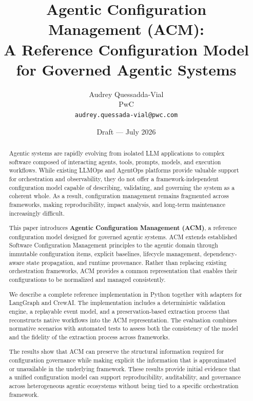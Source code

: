 \documentclass[10pt]{article}
\title{\textbf{Agentic Configuration Management (ACM):\\A Reference Configuration Model for Governed Agentic Systems}}
\author{
  Audrey Quessadda-Vial\\
  PwC\\
  \texttt{audrey.quessada-vial@pwc.com}
}
\date{Draft --- July 2026}
\begin{document}
\maketitle

\begin{abstract}

Agentic systems are rapidly evolving from isolated LLM applications to complex software composed of interacting agents, tools, prompts, models, and execution workflows. While existing LLMOps and AgentOps platforms provide valuable support for orchestration and observability, they do not offer a framework-independent configuration model capable of describing, validating, and governing the system as a coherent whole. As a result, configuration management remains fragmented across frameworks, making reproducibility, impact analysis, and long-term maintenance increasingly difficult.

This paper introduces \textbf{Agentic Configuration Management (ACM)}, a reference configuration model designed for governed agentic systems. ACM extends established Software Configuration Management principles to the agentic domain through immutable configuration items, explicit baselines, lifecycle management, dependency-aware state propagation, and runtime provenance. Rather than replacing existing orchestration frameworks, ACM provides a common representation that enables their configurations to be normalized and managed consistently.

We describe a complete reference implementation in Python together with adapters for LangGraph and CrewAI. The implementation includes a deterministic validation engine, a replayable event model, and a preservation-based extraction process that reconstructs native workflows into the ACM representation. The evaluation combines normative scenarios with automated tests to assess both the consistency of the model and the fidelity of the extraction process across frameworks.

The results show that ACM can preserve the structural information required for configuration governance while making explicit the information that is approximated or unavailable in the underlying framework. These results provide initial evidence that a unified configuration model can support reproducibility, auditability, and governance across heterogeneous agentic ecosystems without being tied to a specific orchestration framework.

\end{abstract}
\end{document}
